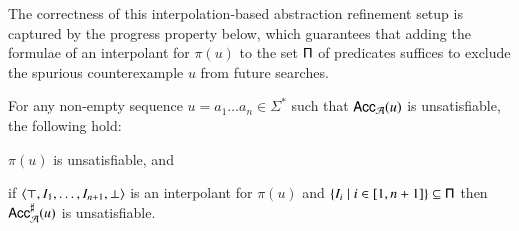 \documentclass[10pt,conference,letterpaper,twocolumn]{IEEEtran}
\begin{document}
The correctness of this interpolation-based abstraction refinement
setup is captured by the progress property below, which guarantees
that adding the formulae of an interpolant for $\pi(u)$ to the set
$\mathsf{\Pi}$ of predicates suffices to exclude the spurious counterexample
$u$ from future searches.

\begin{lemma}\label{lemma:progress}
  For any non-empty sequence $u = a_1\ldots a_n \in \Sigma^*$
  such that $\mathsf{Acc}_{\mathcal{A}}(u)$ is unsatisfiable, the following
  hold: \begin{compactenum}
  \item\label{it1:progress} $\pi(u)$ is unsatisfiable, and
  \item\label{it2:progress} if $\left\langle \top,I_1,\dots,I_{n+1},\bot \right\rangle$
    is an interpolant for $\pi(u)$ and $\left\{ I_i \mid i \in[1,n+1] \right\}
    \subseteq \mathsf{\Pi}$ then ${\mathsf{Acc}}^\sharp_{\mathcal{A}}(u)$ is unsatisfiable.
  \end{compactenum}
\end{lemma}
\end{document}
